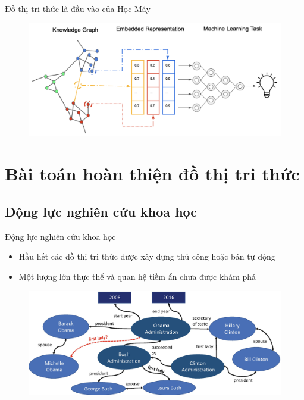 \documentclass[notheorems, aspectratio=54]{beamer}
\begin{document}
	\begin{frame}{Đồ thị tri thức là đầu vào của Học Máy}
		\begin{figure}[H]
			\includegraphics[width=1\linewidth]{figs/KnowledgeGraphEmbedding.png}
			\label{fig:writing-thesis}
		\end{figure}
	\end{frame}
	\section{Bài toán hoàn thiện đồ thị tri thức}
	\subsection{Động lực nghiên cứu khoa học}
	\begin{frame}{Động lực nghiên cứu khoa học}
		\begin{itemize}
			\item Hầu hết các đồ thị tri thức được xây dựng thủ công hoặc bán tự động
			\item Một lượng lớn thực thể và quan hệ tiềm ẩn chưa được khám phá
		\end{itemize}
	\begin{figure}[H]
		\includegraphics[width=1\linewidth]{figs/463227_1_En_4_Fig1_HTML.png}
		\label{fig:writing-thesis}
	\end{figure}
	\end{frame}
\end{document}
